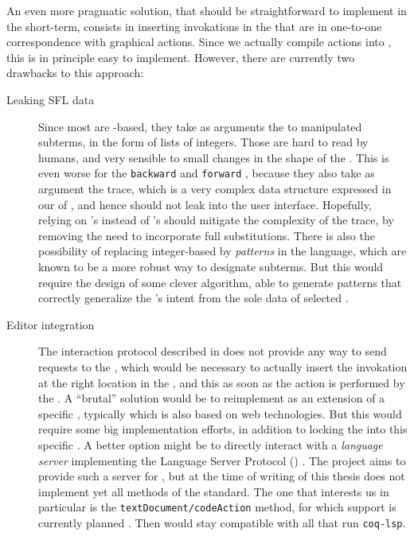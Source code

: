 An even more pragmatic solution, that should be straightforward to implement in
the short-term, consists in inserting  invokations in the 
that are in one-to-one correspondence with graphical actions. Since we actually
compile actions into , this is in principle easy to implement. However,
there are currently two drawbacks to this approach:
\begin{description}
  \item[Leaking SFL data] Since most  are -based,
  they take as arguments the  to manipulated subterms, in the form of
  lists of integers. Those are hard to read by humans, and very sensible to
  small changes in the shape of the . This is even worse for the
  \texttt{backward} and \texttt{forward} , because they also take as
  argument the  trace, which is a very complex data
  structure expressed in our  of , and hence should
  not leak into the user interface. Hopefully, relying on 's
   instead of 's should mitigate the complexity of
  the trace, by removing the need to incorporate full substitutions. There is
  also the possibility of replacing integer-based  by \emph{patterns}
  in the {\kl{\ssreflect}} language, which are known to be a more robust way to
  designate subterms. But this would require the design of some clever
  algorithm, able to generate patterns that correctly generalize the
  's intent from the sole data of selected .

  \item[Editor integration] The interaction protocol described in
   does not provide any way to send requests to the
  , which would be necessary to actually insert the 
  invokation at the right location in the , and this as soon as
  the action is performed by the . A ``brutal'' solution would be
  to reimplement  as an extension of a specific ,
  typically  which is also based on web technologies. But this would
  require some big implementation efforts, in addition to locking the
   into this specific . A better option might be to
  directly interact with a \emph{language server} implementing the Language
  Server Protocol () \cite{LSP}. The  project aims to
  provide such a server for , but at the time of writing of this thesis
  does not implement yet all methods of the  standard. The one that
  interests us in particular is the \texttt{textDocument/codeAction} method, for
  which support is currently planned \cite{coq-lsp-proto}. Then 
  would stay compatible with all  that run \texttt{coq-lsp}.
\end{description}
